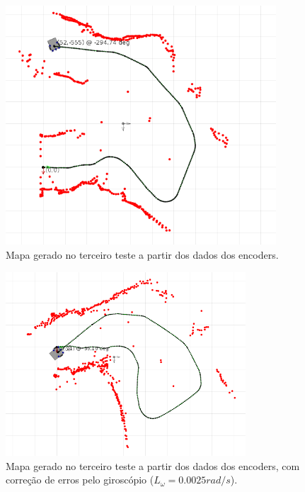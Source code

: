 \begin{figure}[H]
	\centering
	\includegraphics[width=0.9\textwidth]{./figuras/testes/teste3/mapa_encoders.png}
	\caption{Mapa gerado no terceiro teste a partir dos dados dos encoders.}
	\label{fig:teste3_mapa_encoders}
\end{figure}

\begin{figure}[H]
	\centering
	\includegraphics[width=0.8\textwidth]{./figuras/testes/teste3/mapa_encoders_giro.png}
	\caption{Mapa gerado no terceiro teste a partir dos dados dos encoders, com correção de erros pelo giroscópio ($L_\omega = 0.0025 \unit{rad/s}$).}
	\label{fig:teste3_mapa_encoders_giro}
\end{figure}

